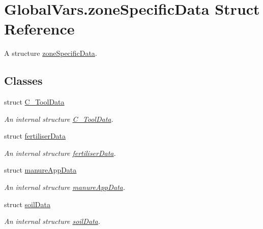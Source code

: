 \hypertarget{struct_global_vars_1_1zone_specific_data}{}\section{Global\+Vars.\+zone\+Specific\+Data Struct Reference}
\label{struct_global_vars_1_1zone_specific_data}


A structure \mbox{\hyperlink{struct_global_vars_1_1zone_specific_data}{zone\+Specific\+Data}}.  


\subsection*{Classes}
\begin{DoxyCompactItemize}
\item 
struct \mbox{\hyperlink{struct_global_vars_1_1zone_specific_data_1_1_c___tool_data}{C\+\_\+\+Tool\+Data}}
\begin{DoxyCompactList}\small\item\em An internal structure \mbox{\hyperlink{struct_global_vars_1_1zone_specific_data_1_1_c___tool_data}{C\+\_\+\+Tool\+Data}}. \end{DoxyCompactList}\item 
struct \mbox{\hyperlink{struct_global_vars_1_1zone_specific_data_1_1fertiliser_data}{fertiliser\+Data}}
\begin{DoxyCompactList}\small\item\em An internal structure \mbox{\hyperlink{struct_global_vars_1_1zone_specific_data_1_1fertiliser_data}{fertiliser\+Data}}. \end{DoxyCompactList}\item 
struct \mbox{\hyperlink{struct_global_vars_1_1zone_specific_data_1_1manure_app_data}{manure\+App\+Data}}
\begin{DoxyCompactList}\small\item\em An internal structure \mbox{\hyperlink{struct_global_vars_1_1zone_specific_data_1_1manure_app_data}{manure\+App\+Data}}. \end{DoxyCompactList}\item 
struct \mbox{\hyperlink{struct_global_vars_1_1zone_specific_data_1_1soil_data}{soil\+Data}}
\begin{DoxyCompactList}\small\item\em An internal structure \mbox{\hyperlink{struct_global_vars_1_1zone_specific_data_1_1soil_data}{soil\+Data}}. \end{DoxyCompactList}\item 

\end{DoxyCompactItemize}
